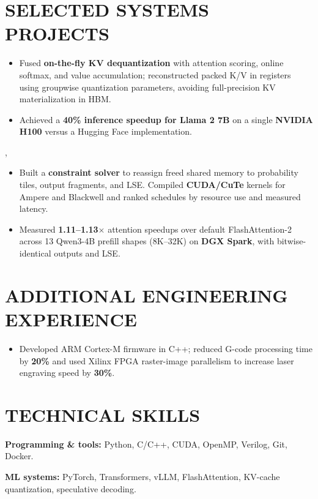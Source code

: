 \documentclass[letterpaper,10pt]{article}
\begin{document}
\section{SELECTED SYSTEMS PROJECTS}
\begin{itemize}
  \item Fused \textbf{on-the-fly KV dequantization} with attention scoring, online softmax, and value accumulation; reconstructed packed K/V in registers using groupwise quantization parameters, avoiding full-precision KV materialization in HBM.
  \item Achieved a \textbf{40\% inference speedup for Llama 2 7B} on a single \textbf{NVIDIA H100} versus a Hugging Face implementation.
\end{itemize}
\sep
{}
\begin{itemize}
  \item Built a \textbf{constraint solver} to reassign freed shared memory to probability tiles, output fragments, and LSE. Compiled \textbf{CUDA/CuTe} kernels for Ampere and Blackwell and ranked schedules by resource use and measured latency.
  \item Measured \textbf{1.11--1.13$\times$} attention speedups over default FlashAttention-2 across 13 Qwen3-4B prefill shapes (8K--32K) on \textbf{DGX Spark}, with bitwise-identical outputs and LSE.
\end{itemize}

\section{ADDITIONAL ENGINEERING EXPERIENCE}
\begin{itemize}
  \item Developed ARM Cortex-M firmware in C++; reduced G-code processing time by \textbf{20\%} and used Xilinx FPGA raster-image parallelism to increase laser engraving speed by \textbf{30\%}.
\end{itemize}
\section{TECHNICAL SKILLS}
\textbf{Programming \& tools:} Python, C/C++, CUDA, OpenMP, Verilog, Git, Docker.\par
\textbf{ML systems:} PyTorch, Transformers, vLLM, FlashAttention, KV-cache quantization, speculative decoding.\par
\end{document}
